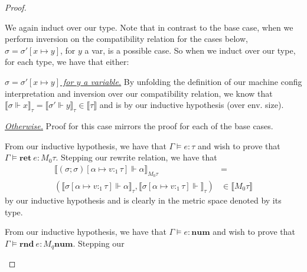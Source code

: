 \begin{proof}
\begin{description}
\begin{description}
\begin{description}
        \end{description}
      \item[\textit{(env. size) n + 1.}] We again induct over our type. 
        Note that in contrast to the base case, when we perform inversion on the
        compatibility relation for the cases below, $\sigma = \sigma'[x \mapsto
        y]$, for $y$ a var, is a possible case. 
        So when we induct over our type, for each type, we have that either:
        \begin{description}
          \item{\underline{\textit{$\sigma = \sigma'[x \mapsto y]$ for $y$ a
            variable.}}} By unfolding the definition of our machine config
            interpretation and inversion over our compatibility relation, we
            know that $\llbracket \sigma \Vdash x \rrbracket_{\tau} = \llbracket
            \sigma' \Vdash y \rrbracket_{\tau} \in \llbracket \tau \rrbracket$
            and is  by our inductive hypothesis (over env.
            size).
          \item{\underline{\textit{Otherwise.}}} Proof for this case mirrors the
            proof for each of the base cases.
        \end{description}
    \end{description}
  \item[\textsc{(ty. rule) Ret.}] 
    From our inductive hypothesis, we have that $\Gamma \vDash e : \tau$ and
    wish to prove that $\Gamma \vDash \mathbf{ret} \ e : M_0 \tau$. Stepping our
    rewrite relation, we have that 
    \begin{equation}
      \begin{aligned}
        \llbracket (\sigma; \sigma)[\alpha \mapsto v:_1 \tau] \Vdash \alpha
        \rrbracket_{M_0 \tau} 
        &= \\
        (\llbracket \sigma[\alpha \mapsto v:_1 \tau] \Vdash \alpha
        \rrbracket_{\tau}, \llbracket \sigma[\alpha
        \mapsto v:_1 \tau] \Vdash \rrbracket_{\tau})
        &\in 
        \llbracket M_0 \tau \rrbracket
      \end{aligned}
    \end{equation}
    by our inductive hypothesis and is clearly  in the metric
    space denoted by its type.
  \item[\textsc{(ty. rule) Rnd.}]
    From our inductive hypothesis, we have that $\Gamma \vDash e : \mathbf{num}$ and
    wish to prove that $\Gamma \vDash \mathbf{rnd} \ e : M_q \mathbf{num}$. Stepping our

\end{description}
\end{proof}
